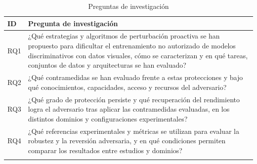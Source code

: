 \begin{table}[t]
\caption{Preguntas de investigación}\label{tab:rq}
\footnotesize
\begin{tabularx}{\textwidth}{@{}L{0.9cm}Y{1.0}@{}}
\toprule
ID & Pregunta de investigación \\
\midrule
RQ1 & ¿Qué estrategias y algoritmos de perturbación proactiva se han propuesto para dificultar el entrenamiento no autorizado de modelos discriminativos con datos visuales, cómo se caracterizan y en qué tareas, conjuntos de datos y arquitecturas se han evaluado? \\
RQ2 & ¿Qué contramedidas se han evaluado frente a estas protecciones y bajo qué conocimientos, capacidades, acceso y recursos del adversario? \\
RQ3 & ¿Qué grado de protección persiste y qué recuperación del rendimiento logra el adversario tras aplicar las contramedidas evaluadas, en los distintos dominios y configuraciones experimentales? \\
RQ4 & ¿Qué referencias experimentales y métricas se utilizan para evaluar la robustez y la reversión adversaria, y en qué condiciones permiten comparar los resultados entre estudios y dominios? \\
\botrule
\end{tabularx}
\end{table}
